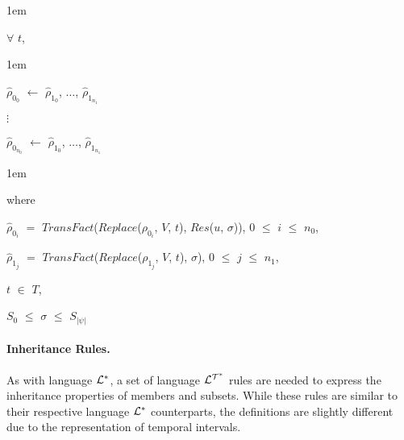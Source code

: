 \documentclass[11pt]{report}
\newenvironment{vquote}
{
  \begin{list}{}{\leftmargin 1em}\item[]
}
{
  \end{list}
}
\begin{document}
            \begin{vquote}
              $\forall$ $t$,
            \end{vquote}

            \begin{vquote}
              $\hat{\rho}_{0_0}$ $\leftarrow$
              $\hat{\rho}_{1_0}$, $\ldots$, $\hat{\rho}_{1_{n_1}}$

              $\vdots$

              $\hat{\rho}_{0_{n_0}}$ $\leftarrow$
              $\hat{\rho}_{1_0}$, $\ldots$, $\hat{\rho}_{1_{n_1}}$
            \end{vquote}

            \begin{vquote}
              where

              \hspace{1em}
              $\hat{\rho}_{0_i}$ $=$
              $TransFact$($Replace$($\rho_{0_i}$, $V$, $t$), $Res$($u$, $\sigma$)),
              $0$ $\leq$ $i$ $\leq$ $n_0$,

              \hspace{1em}
              $\hat{\rho}_{1_j}$ $=$
              $TransFact$($Replace$($\rho_{1_j}$, $V$, $t$), $\sigma$),
              $0$ $\leq$ $j$ $\leq$ $n_1$,

              \hspace{1em}
              $t$ $\in$ $T$,

              \hspace{1em}
              $S_0$ $\leq$ $\sigma$ $\leq$ $S_{|\psi|}$
            \end{vquote}

          \paragraph
            {\bf Inheritance Rules.}

              As with language ${\cal L^*}$, a set of language
              ${\cal L^{T^*}}$ rules are needed to express the inheritance
              properties of members and subsets. While these rules are
              similar to their respective language ${\cal L^*}$ counterparts,
              the definitions are slightly different due to the
              representation of temporal intervals.
\end{document}
